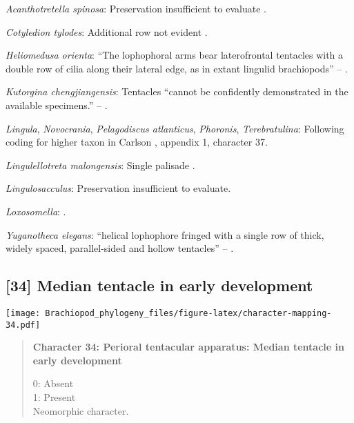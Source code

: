 \documentclass[openany]{book}
\theoremstyle{definition}
\theoremstyle{definition}
\theoremstyle{definition}
\theoremstyle{remark}
\begin{document}
\hypertarget{Acanthotretella_spinosa-coding-33}{}
\emph{Acanthotretella spinosa}: Preservation insufficient to evaluate
\citep{Holmer2006Aspinose}.

\hypertarget{Cotyledion_tylodes-coding-33}{}
\emph{Cotyledion tylodes}: Additional row not evident \citep{Zhang2013}.

\hypertarget{Heliomedusa_orienta-coding-33}{}
\emph{Heliomedusa orienta}: ``The lophophoral arms bear laterofrontal
tentacles with a double row of cilia along their lateral edge, as in
extant lingulid brachiopods'' -- \citet{Zhang2009Architectureand}.

\hypertarget{Kutorgina_chengjiangensis-coding-33}{}
\emph{Kutorgina chengjiangensis}: Tentacles ``cannot be confidently
demonstrated in the available specimens.'' --
\citet{Zhang2007Rhynchonelliformeanbrachiopods}.

\hypertarget{Lingula-coding-33}{}
\emph{Lingula}, \emph{Novocrania}, \emph{Pelagodiscus atlanticus},
\emph{Phoronis}, \emph{Terebratulina}: Following coding for higher taxon
in Carlson \citeyearpar{Carlson1995Phylogeneticrelationships}, appendix
1, character 37.

\hypertarget{Lingulellotreta_malongensis-coding-33}{}
\emph{Lingulellotreta malongensis}: Single palisade
\citep{Zhang2004Newdata}.

\hypertarget{Lingulosacculus-coding-33}{}
\emph{Lingulosacculus}: Preservation insufficient to evaluate.

\hypertarget{Loxosomella-coding-33}{}
\emph{Loxosomella}: \citet{Nielsen1966}.

\hypertarget{Yuganotheca_elegans-coding-33}{}
\emph{Yuganotheca elegans}: ``helical lophophore fringed with a single
row of thick, widely spaced, parallel-sided and hollow tentacles'' --
\citet{Zhang2014Anearly}.

\subsection*{{[}34{]} Median tentacle in early
development}\label{median-tentacle-in-early-development}

\texttt{[image: Brachiopod\_phylogeny\_files/figure-latex/character-mapping-34.pdf]}

\begin{quote}
\textbf{Character 34: Perioral tentacular apparatus: Median tentacle in
early development}

0: Absent\\
1: Present\\
Neomorphic character.
\end{quote}
\end{document}
